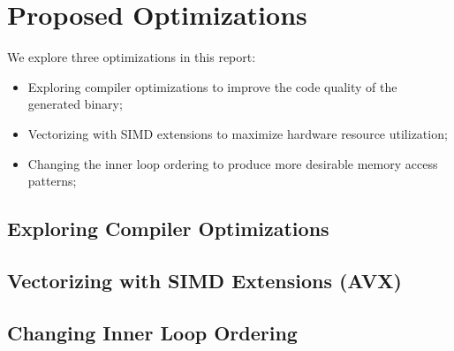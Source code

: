 
\section{Proposed Optimizations}
\label{sec-opts}

We explore three optimizations in this report:

\begin{itemize}
  \item Exploring compiler optimizations to improve the code quality of
    the generated binary;
  \item Vectorizing with SIMD extensions to maximize hardware resource
    utilization;
  \item Changing the inner loop ordering to produce more desirable memory
    access patterns;

\end{itemize}

\subsection{Exploring Compiler Optimizations}


\subsection{Vectorizing with SIMD Extensions (AVX)}


\subsection{Changing Inner Loop Ordering}


%

%
